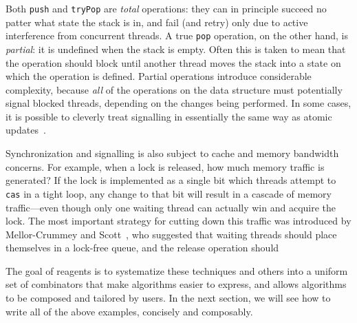 \documentclass[preprint,nocopyrightspace]{sigplanconf}
\begin{document}
Both \lstinline{push} and \lstinline{tryPop} are \emph{total} operations: they
can in principle succeed no patter what state the stack is in, and fail (and
retry) only due to active interference from concurrent threads.  A true
\lstinline{pop} operation, on the other hand, is \emph{partial}: it is undefined
when the stack is empty.  Often this is taken to mean that the operation should
block until another thread moves the stack into a state on which the operation
is defined.  Partial operations introduce considerable complexity, because
\emph{all} of the operations on the data structure must potentially signal
blocked threads, depending on the changes being performed.  In some cases, it is
possible to cleverly treat signalling in essentially the same way as atomic
updates~\cite{?}.

Synchronization and signalling is also subject to cache and memory bandwidth
concerns.  For example, when a lock is released, how much memory traffic is
generated?  If the lock is implemented as a single bit which threads attempt to
\lstinline{cas} in a tight loop, any change to that bit will result in a cascade
of memory traffic---even though only one waiting thread can actually win and
acquire the lock.  The most important strategy for cutting down this traffic was
introduced by Mellor-Crummey and Scott~\cite{?}, who suggested that waiting
threads should place themselves in a lock-free queue, and the release operation
should  %



The goal of reagents is to systematize these techniques and others into a
uniform set of combinators that make algorithms easier to express, and allows
algorithms to be composed and tailored by users.  In the next section, we will
see how to write all of the above examples, concisely and composably.

\end{document}
